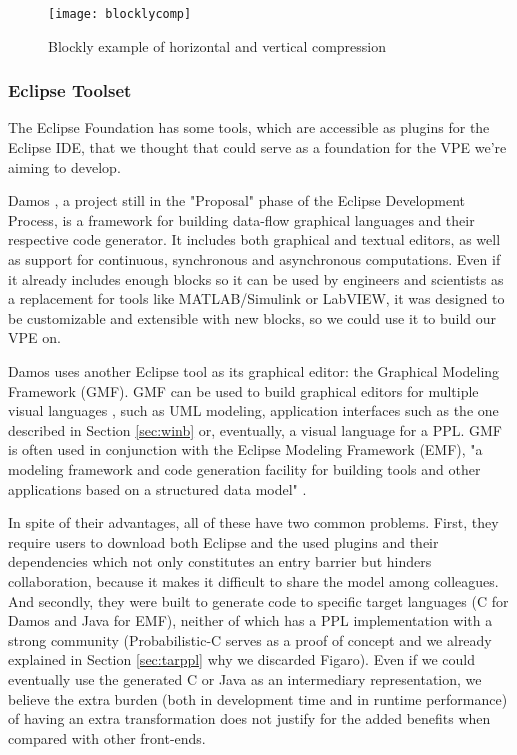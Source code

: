 \begin{figure}[t]
  \begin{center}
    \leavevmode
    \texttt{[image: blocklycomp]}
    \caption{Blockly example of horizontal and vertical compression \cite{blockly}}
    \label{fig:blocklycomp}
  \end{center}
\end{figure}

\subsubsection{Eclipse Toolset}

The Eclipse Foundation has some tools, which are accessible as plugins for the
Eclipse IDE, that we thought that could serve as a foundation for the VPE we're
aiming to develop.

Damos \cite{damos}, a project still in the "Proposal" phase of the Eclipse
Development Process, is a framework for building data-flow graphical languages
and their respective code generator. It includes both graphical and textual editors,
as well as support for continuous, synchronous and asynchronous computations.
Even if it already includes enough blocks so it can be used by engineers and scientists
as a replacement for tools like MATLAB/Simulink or LabVIEW, it was designed to
be customizable and extensible with new blocks, so we could use it to build our VPE on.

Damos uses another Eclipse tool as its graphical editor: the Graphical Modeling
Framework (GMF). GMF can be used to build graphical editors for multiple visual
languages \cite{gmf}, such as UML modeling, application interfaces such as the
one described in Section \ref{sec:winb} or, eventually, a visual language for a
PPL. GMF is often used in conjunction with the Eclipse Modeling Framework (EMF),
"a modeling framework and code generation facility for building tools and other
applications based on a structured data model" \cite{emf}.

In spite of their advantages, all of these have two common problems. First, they require
users to download both Eclipse and the used plugins and their dependencies
which not only constitutes an entry barrier but hinders collaboration, because
it makes it difficult to share the model among colleagues. And secondly, they
were built to generate code to specific target languages (C for Damos and Java
for EMF), neither of which has a PPL implementation with a strong community
(Probabilistic-C \cite{Paige2014} serves as a proof of concept and we already explained
in Section \ref{sec:tarppl} why we discarded Figaro). Even if we could eventually
use the generated C or Java as an intermediary representation, we believe the
extra burden (both in development time and in runtime performance) of having an
extra transformation does not justify for the added benefits when compared with
other front-ends.

